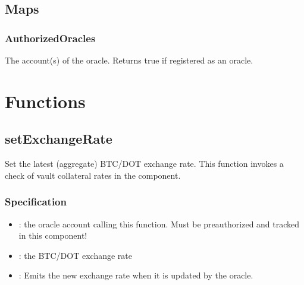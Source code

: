 \documentclass[a4paper,10pt,english]{sphinxmanual}
\begin{document}
\subsection{Maps}
\label{\detokenize{spec/oracle:maps}}

\subsubsection{AuthorizedOracles}
\label{\detokenize{spec/oracle:authorizedoracles}}
The account(s) of the oracle. Returns true if registered as an oracle.


\section{Functions}
\label{\detokenize{spec/oracle:functions}}

\subsection{setExchangeRate}
\label{\detokenize{spec/oracle:setexchangerate}}\label{\detokenize{spec/oracle:id1}}
Set the latest (aggregate) BTC/DOT exchange rate. This function invokes a check of vault collateral rates in the {\hyperref[\detokenize{spec/vault-registry:vault-registry}]{}} component.


\subsubsection{Specification}
\label{\detokenize{spec/oracle:specification}}


\begin{itemize}
\item {} 
: the oracle account calling this function. Must be pre\sphinxhyphen{}authorized and tracked in this component!

\item {} 
: the  BTC/DOT exchange rate

\end{itemize}

\begin{itemize}
\item {} 
: Emits the new exchange rate when it is updated by the oracle.

\end{itemize}
\end{document}
